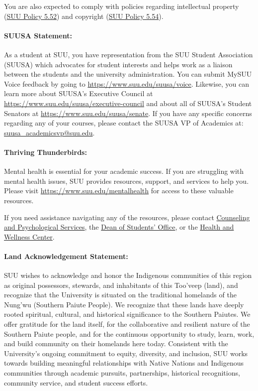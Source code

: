 \documentclass[12pt, letterpaper]{article}
\begin{document}
\noindent
You are also expected to comply with policies regarding intellectual property (\href{https://www.suu.edu/policies/05/52.html}{SUU Policy 5.52}) and copyright (\href{https://www.suu.edu/policies/05/54.html}{SUU Policy 5.54}).

\paragraph{SUUSA Statement:}
As a student at SUU, you have representation from the SUU Student Association (SUUSA) which advocates for student interests and helps work as a liaison between the students and the university administration. You can submit MySUU Voice feedback by going to \href{https://www.suu.edu/suusa/voice}{https://www.suu.edu/suusa/voice}. Likewise, you can learn more about SUUSA’s Executive Council at \href{https://www.suu.edu/suusa/executive-council}{https://www.suu.edu/suusa/executive-council} and about all of SUUSA’s Student Senators at \href{https://www.suu.edu/suusa/senate}{https://www.suu.edu/suusa/senate}. If you have any specific concerns regarding any of your courses, please contact the SUUSA VP of Academics at: \href{suusa_academicsvp@suu.edu}{suusa\_\ignorespaces academicsvp@suu.edu}.

\paragraph{Thriving Thunderbirds:}
Mental health is essential for your academic success. If you are struggling with mental health issues, SUU provides resources, support, and services to help you. Please visit \href{https://www.suu.edu/mentalhealth}{https://www.suu.edu/mentalhealth} for access to these valuable resources.

\noindent
If you need assistance navigating any of the resources, please contact \href{https://www.suu.edu/caps/}{Counseling and Psychological Services}, the \href{https://www.suu.edu/deanofstudents/}{Dean of Students’ Office}, or the \href{https://www.suu.edu/health/}{Health and Wellness Center}.

\paragraph{Land Acknowledgement Statement:}
SUU wishes to acknowledge and honor the Indigenous communities of this region as original possessors, stewards, and inhabitants of this Too’veep (land), and recognize that the University is situated on the traditional homelands of the Nung’wu (Southern Paiute People). We recognize that these lands have deeply rooted spiritual, cultural, and historical significance to the Southern Paiutes. We offer gratitude for the land itself, for the collaborative and resilient nature of the Southern Paiute people, and for the continuous opportunity to study, learn, work, and build community on their homelands here today. Consistent with the University's ongoing commitment to equity, diversity, and inclusion, SUU works towards building meaningful relationships with Native Nations and Indigenous communities through academic pursuits, partnerships, historical recognitions, community service, and student success efforts.
\end{document}
